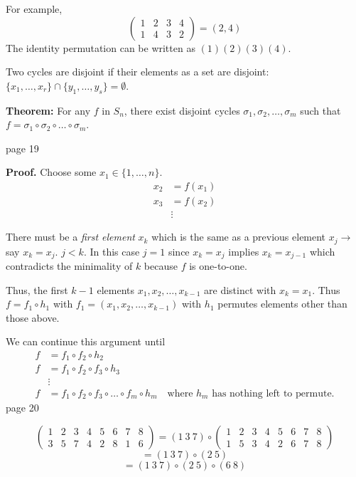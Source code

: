 \documentclass{article}
\begin{document}
For example,
\[
\begin{pmatrix}
1 & 2 & 3 & 4 \\
1 & 4 & 3 & 2
\end{pmatrix} = (2, 4)
\]
The identity permutation can be written as $(1)(2)(3)(4)$.

Two cycles are disjoint if their elements as a set are disjoint: $\{ x_1, \ldots, x_r \} \cap \{ y_1, \ldots, y_s \} = \emptyset$.

\textbf{Theorem:} For any $f$ in $S_n$, there exist disjoint cycles $\sigma_1, \sigma_2, \ldots, \sigma_m$ such that $f = \sigma_1 \circ \sigma_2 \circ \ldots \circ \sigma_m$.

\newpage
\noindent page 19

\textbf{Proof.} Choose some $x_1 \in \{ 1, \ldots, n \}$. 
\[
\begin{aligned}
    x_2 &= f(x_1) \\
    x_3 &= f(x_2) \\
    &\vdots
\end{aligned}
\]

There must be a \textit{first element} $x_k$ which is the same as a previous element $x_j \to$ say $x_k = x_j$. $j < k$. In this case $j = 1$ since $x_k = x_j$ implies $x_k = x_{j-1}$ which contradicts the minimality of $k$ because $f$ is one-to-one.

Thus, the first $k-1$ elements $x_1, x_2, \ldots, x_{k-1}$ are distinct with $x_k = x_1$. Thus $f = f_1 \circ h_1$ with $f_1 = (x_1, x_2, \ldots, x_{k-1})$ with $h_1$ permutes elements other than those above.

We can continue this argument until
\[
\begin{aligned}
    f &= f_1 \circ f_2 \circ h_2 \\
    f &= f_1 \circ f_2 \circ f_3 \circ h_3 \\
    &\vdots \\
    f &= f_1 \circ f_2 \circ f_3 \circ \ldots \circ f_m \circ h_m \quad \text{where } h_m \text{ has nothing left to permute.}
\end{aligned}
\]
\newpage
\noindent page 20

\[
\begin{pmatrix}
1 & 2 & 3 & 4 & 5 & 6 & 7 & 8 \\
3 & 5 & 7 & 4 & 2 & 8 & 1 & 6
\end{pmatrix}
= (1 \ 3 \ 7) \circ 
\begin{pmatrix}
1 & 2 & 3 & 4 & 5 & 6 & 7 & 8 \\
1 & 5 & 3 & 4 & 2 & 6 & 7 & 8
\end{pmatrix}
\]
\[
= (1 \ 3 \ 7) \circ (2 \ 5)
\]
\[
= (1 \ 3 \ 7) \circ (2 \ 5) \circ (6 \ 8)
\]
\end{document}
